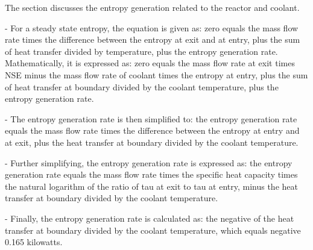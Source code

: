 The section discusses the entropy generation related to the reactor and coolant.

- For a steady state entropy, the equation is given as:
  zero equals the mass flow rate times the difference between the entropy at exit and at entry, plus the sum of heat transfer divided by temperature, plus the entropy generation rate.
  Mathematically, it is expressed as:
  zero equals the mass flow rate at exit times NSE minus the mass flow rate of coolant times the entropy at entry, plus the sum of heat transfer at boundary divided by the coolant temperature, plus the entropy generation rate.

- The entropy generation rate is then simplified to:
  the entropy generation rate equals the mass flow rate times the difference between the entropy at entry and at exit, plus the heat transfer at boundary divided by the coolant temperature.

- Further simplifying, the entropy generation rate is expressed as:
  the entropy generation rate equals the mass flow rate times the specific heat capacity times the natural logarithm of the ratio of tau at exit to tau at entry, minus the heat transfer at boundary divided by the coolant temperature.

- Finally, the entropy generation rate is calculated as:
  the negative of the heat transfer at boundary divided by the coolant temperature, which equals negative 0.165 kilowatts.